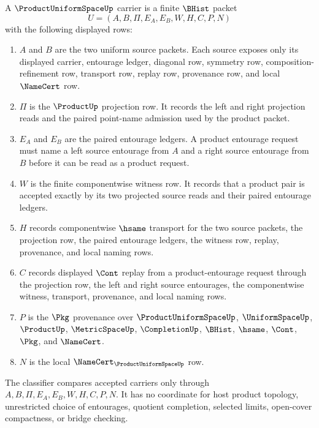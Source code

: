 \begin{definition}
\label{def:product-uniform-space-carrier}
A $\ProductUniformSpaceUp$ carrier is a finite $\BHist$ packet
$$
U=(A,B,\Pi,E_A,E_B,W,H,C,P,N)
$$
with the following displayed rows:
\begin{enumerate}
\item $A$ and $B$ are the two uniform source packets. Each source exposes only its displayed carrier, entourage ledger, diagonal row, symmetry row, composition-refinement row, transport row, replay row, provenance row, and local $\NameCert$ row.
\item $\Pi$ is the $\ProductUp$ projection row. It records the left and right projection reads and the paired point-name admission used by the product packet.
\item $E_A$ and $E_B$ are the paired entourage ledgers. A product entourage request must name a left source entourage from $A$ and a right source entourage from $B$ before it can be read as a product request.
\item $W$ is the finite componentwise witness row. It records that a product pair is accepted exactly by its two projected source reads and their paired entourage ledgers.
\item $H$ records componentwise $\hsame$ transport for the two source packets, the projection row, the paired entourage ledgers, the witness row, replay, provenance, and local naming rows.
\item $C$ records displayed $\Cont$ replay from a product-entourage request through the projection row, the left and right source entourages, the componentwise witness, transport, provenance, and local naming rows.
\item $P$ is the $\Pkg$ provenance over $\ProductUniformSpaceUp$, $\UniformSpaceUp$, $\ProductUp$, $\MetricSpaceUp$, $\CompletionUp$, $\BHist$, $\hsame$, $\Cont$, $\Pkg$, and $\NameCert$.
\item $N$ is the local $\NameCert_{\ProductUniformSpaceUp}$ row.
\end{enumerate}
The classifier compares accepted carriers only through $A,B,\Pi,E_A,E_B,W,H,C,P,N$. It has no coordinate for host product topology, unrestricted choice of entourages, quotient completion, selected limits, open-cover compactness, or bridge checking.
\end{definition}


